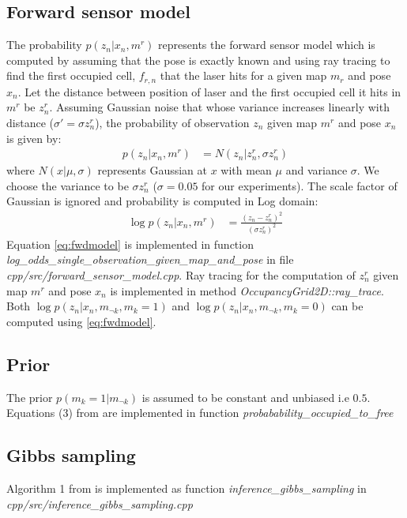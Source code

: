 \documentclass[10pt,oneside,letterpaper]{article}
\begin{document}
\subsection{Forward sensor model}
The probability $p(z_n|x_n, m^r)$ represents the forward sensor model which is computed by assuming that the pose is exactly known and using ray tracing to find the first occupied cell, $f_{r,n}$ that the laser hits for a given map $m_r$ and pose $x_n$. Let the distance between position of laser and the first occupied cell it hits in $m^r$ be $z^r_n$. Assuming Gaussian noise that whose variance increases linearly with distance ($\sigma' = \sigma z^r_n$),  the probability of observation $z_n$ given map $m^r$ and pose $x_n$ is given by: 
\begin{align}
  p(z_n|x_n, m^r) &= N(z_n|z^r_n, \sigma z^r_n)
\end{align}
where $N(x|\mu, \sigma)$ represents Gaussian at $x$ with mean $\mu$ and variance $\sigma$. We choose the variance to be $\sigma z^r_n$ ($\sigma = 0.05$ for our experiments). The scale factor of Gaussian is ignored and probability is computed in Log domain:
\begin{align}
  \log p (z_n|x_n, m^r) &= \frac{(z_n - z^r_n)^2}{(\sigma z^r_n)^2}
  \label{eq:fwdmodel}
\end{align}
Equation \eqref{eq:fwdmodel} is implemented in function \emph{log\_odds\_single\_observation\_given\_map\_and\_pose} in file 
\emph{cpp/src/forward\_sensor\_model.cpp}. Ray tracing for the computation of $z^r_n$ given map $m^r$ and pose $x_n$ is implemented in method \emph{OccupancyGrid2D::ray\_trace}. Both $\log p(z_n|x_n, m_{\neg k}, m_k = 1)$ and $\log p(z_n|x_n, m_{\neg k}, m_k = 0)$ can be computed using \eqref{eq:fwdmodel}.

\subsection{Prior}
The prior $p(m_k = 1 | m_{\neg k})$ is assumed to be constant and unbiased i.e $0.5$. Equations (3) from \cite{merali2013icra} are implemented in function \emph{probabability\_occupied\_to\_free}

\subsection{Gibbs sampling}
Algorithm 1 from \cite{merali2013icra} is implemented as function \emph{inference\_gibbs\_sampling} in \emph{cpp/src/inference\_gibbs\_sampling.cpp}
\end{document}
